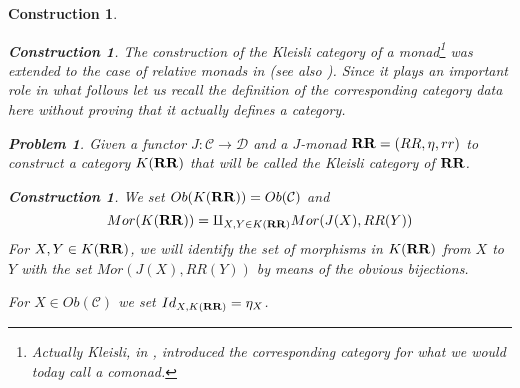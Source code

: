 \documentclass[12pt]{amsart}
\newtheorem{problem}[proposition]{Problem}
\newtheorem{construction}[proposition]{Construction}
\newcommand{\llabel}[1]{\label{#1}}
\newcommand{\sr}{\rightarrow}
\newcommand{\RR}{{\bf RR}}
\newcommand{\C}{{\mathcal C}}
\newcommand{\D}{{\mathcal D}}
\begin{document}
\begin{construction}
\begin{construction}
The construction of the Kleisli category of a monad\footnote{Actually Kleisli,
  in \cite{Kleisli}, introduced the corresponding category for what we would
  today call a comonad.} was extended to the case of relative monads in
\cite[p.~8]{ACU2} (see also \cite[Constr. 2.9]{LandJf}). Since it plays an
important role in what follows let us recall the definition of the
corresponding category data here without proving that it actually defines a
category.
%
\begin{problem}
  \llabel{2017.03.12.prob3}
  Given a functor $J:\C\sr\D$ and a $J$-monad $\RR=(RR,\eta,rr)$ to construct a
  category $K(\RR)$ that will be called the Kleisli category of $\RR$.
\end{problem}
%
\begin{construction}\rm
\llabel{2017.03.12.constr3}
We set $Ob(K(\RR))=Ob(\C)$ and 
%
$$Mor(K(\RR))=\amalg_{X,Y\in K(\RR)}Mor(J(X),RR(Y))$$
%
For $X,Y\in K(\RR)$, we will identify the set of morphisms in $K(\RR)$ from $X$
to $Y$ with the set $Mor(J(X),RR(Y))$ by means of the obvious bijections.

For $X\in Ob(\C)$ we set $Id_{X,K(\RR)}=\eta_{X}$.


\end{construction}
\end{construction}
\end{construction}
\end{document}

